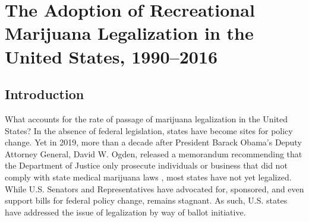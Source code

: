 \chapter{The Adoption of Recreational Marijuana Legalization in the United States, 1990--2016}







\section{Introduction}

What accounts for the rate of passage of marijuana legalization in the United States? In the absence of federal legislation, states have become sites for policy change. Yet in 2019, more than a decade after President Barack Obama's Deputy Attorney General, David W. Ogden, released a memorandum recommending that the Department of Justice only prosecute individuals or business that did not comply with state medical marijuana laws \citep{ogden_2009}, most states have not yet legalized. While U.S. Senators and Representatives have advocated for, sponsored, and even support bills for federal policy change, remains stagnant. As such, U.S. states have addressed the issue of legalization by way of ballot initiative. 

